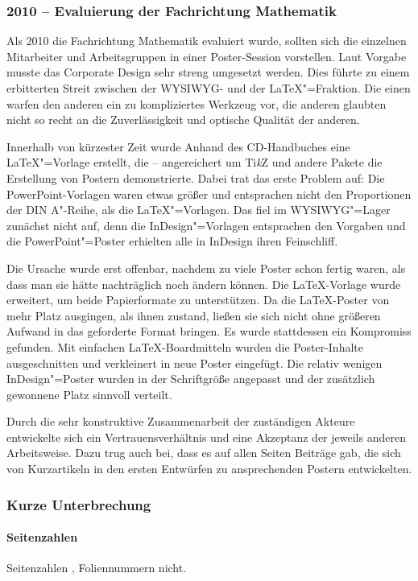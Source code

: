 \begin{frame}[allowframebreaks]\frametitle{2010 – Evaluierung der Fachrichtung Mathematik}
  Als 2010 die Fachrichtung Mathematik evaluiert wurde, sollten sich
  die einzelnen Mitarbeiter und Arbeitsgruppen in einer Poster-Session
  vorstellen. Laut Vorgabe musste das Corporate Design sehr streng
  umgesetzt werden. Dies führte zu einem erbitterten Streit zwischen
  der WYSIWYG- und der \LaTeX"=Fraktion. Die einen warfen den anderen
  ein zu kompliziertes Werkzeug vor, die anderen glaubten nicht so
  recht an die Zuverlässigkeit und optische Qualität der anderen.

  Innerhalb von kürzester Zeit wurde Anhand des CD-Handbuches eine
  \LaTeX"=Vorlage erstellt, die – angereichert um Ti\emph{k}Z und
  andere Pakete die Erstellung von Postern demonstrierte. Dabei trat
  das erste Problem auf: Die PowerPoint-Vorlagen waren etwas größer
  und entsprachen nicht den Proportionen der DIN A"-Reihe, als die
  \LaTeX"=Vorlagen. Das fiel im WYSIWYG"=Lager zunächst nicht auf,
  denn die InDesign"=Vorlagen entsprachen den Vorgaben und die
  PowerPoint"=Poster erhielten alle in InDesign ihren Feinschliff.

  Die Ursache wurde erst offenbar, nachdem zu viele Poster schon
  fertig waren, als dass man sie hätte nachträglich noch ändern
  können. Die \LaTeX{}-Vorlage wurde erweitert, um beide Papierformate
  zu unterstützen. Da die \LaTeX{}-Poster von mehr Platz ausgingen,
  als ihnen zustand, ließen sie sich nicht ohne größeren Aufwand in
  das geforderte Format bringen. Es wurde stattdessen ein Kompromiss
  gefunden. Mit einfachen \LaTeX{}-Boardmitteln wurden die
  Poster-Inhalte ausgeschnitten und verkleinert in neue Poster
  eingefügt. Die relativ wenigen InDesign"=Poster wurden in der
  Schriftgröße angepasst und der zusätzlich gewonnene Platz sinnvoll
  verteilt.%

  Durch die sehr konstruktive Zusammenarbeit der zuständigen Akteure
  entwickelte sich ein Vertrauensverhältnis und eine Akzeptanz der
  jeweils anderen Arbeitsweise. Dazu trug auch bei, dass es auf allen
  Seiten Beiträge gab, die sich von Kurzartikeln in den ersten
  Entwürfen zu ansprechenden Postern entwickelten.
\end{frame}
\begin{frame}\frametitle{Kurze Unterbrechung}
  \framesubtitle{Seitenzahlen}
  Seitenzahlen   , Foliennummern nicht.
\end{frame}
